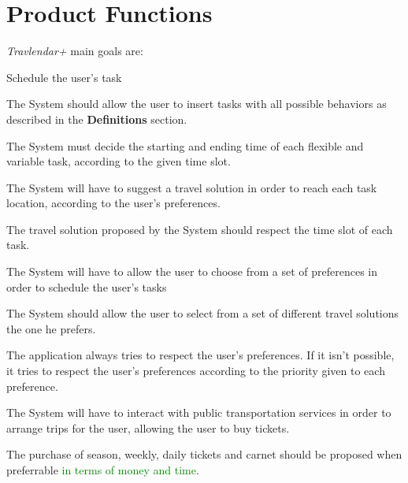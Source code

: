 \section{Product Functions}
\emph{Travlendar+} main goals are:

\begin{goalList}
\item Schedule the user's task

	\begin{enumerate}[label={[}G 1.\arabic*{]}:]
    
    \item The System should allow the user to insert tasks with all possible behaviors as described in the \textbf{Definitions} section.
    
    \item The System must decide the starting and ending time of each flexible and variable task, according to the given time slot.
    \item The System will have to suggest a travel solution in order to reach each task location, according to the user's preferences.
    \item The travel solution proposed by the System should respect the time slot of each task.  
	\end{enumerate}
    
\item The System will have to allow the user to choose from a set of preferences in order to schedule the user's tasks 

\item The System should allow the user to select from a set of different travel solutions the one he prefers.

\item The application always tries to respect the user's preferences. If it isn't possible, it tries to respect the user's preferences according to the priority given to each preference.

\item The System will have to interact with public transportation services in order to arrange trips for the user, allowing the user to buy tickets.

\begin{enumerate}[label={[}G 5.\arabic*{]}:]
\item The purchase of season, weekly, daily tickets and carnet should be proposed when preferrable \textcolor{green}{in terms of money and time}.  

\end{enumerate}


\end{goalList}
